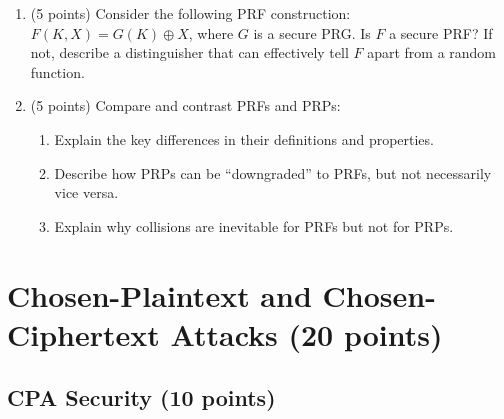 \documentclass[10pt,a4paper,american]{exam}
\begin{document}
\begin{enumerate}
	\item (5 points) Consider the following PRF construction: $F(K, X) = G(K) \oplus X$, where $G$ is a secure PRG. Is $F$ a secure PRF? If not, describe a distinguisher that can effectively tell $F$ apart from a random function.

	\item (5 points) Compare and contrast PRFs and PRPs:
	      \begin{enumerate}
		      \item Explain the key differences in their definitions and properties.
		      \item Describe how PRPs can be ``downgraded'' to PRFs, but not necessarily vice versa.
		      \item Explain why collisions are inevitable for PRFs but not for PRPs.
	      \end{enumerate}
\end{enumerate}

\section{Chosen-Plaintext and Chosen-Ciphertext Attacks (20 points)}

\subsection{CPA Security (10 points)}
\end{document}
